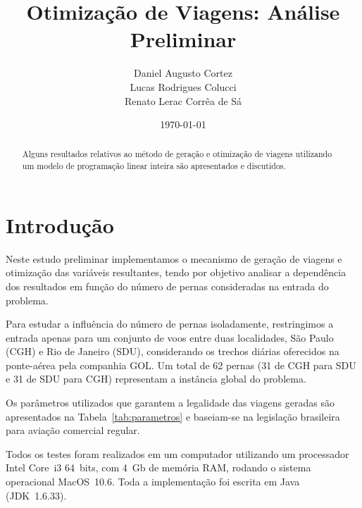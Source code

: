 \documentclass[12pt,a4paper]{article}
\newcommand{\zerar}{\setcounter{equation}{0}\setcounter{figure}{0}\setcounter{table}{0}}
\begin{document}
\title{\bf Otimização de Viagens: Análise Preliminar}
\author{Daniel Augusto Cortez \\ Lucas Rodrigues Colucci \\ Renato Lerac Corrêa de Sá}
\date{\today}

\maketitle

\begin{abstract}
	Alguns resultados relativos ao método de geração e otimização de viagens
	utilizando um modelo de programação linear inteira são apresentados e discutidos.
\end{abstract}


\zerar
\section{Introdução}
\label{sec:introducao}

Neste estudo preliminar implementamos o mecanismo de geração de viagens e otimização das variáveis
resultantes, tendo por objetivo analisar a dependência dos resultados em função do número de pernas 
consideradas na entrada do problema. 

Para estudar a influência do número de pernas isoladamente, restringimos a entrada apenas para um
conjunto de voos entre duas localidades, São Paulo (CGH) e Rio de Janeiro (SDU), considerando os
trechos diárias oferecidos na ponte-aérea pela companhia GOL. Um total de 62 pernas (31 de CGH para 
SDU e 31 de SDU para CGH) representam a instância global do problema.

Os parâmetros utilizados que garantem a legalidade das viagens geradas são apresentados na 
Tabela~\ref{tab:parametros} e baseiam-se na legislação brasileira para aviação comercial regular. 

Todos os testes foram realizados em um computador utilizando um processador Intel Core~i3 64~bits, 
com 4~Gb de memória RAM, rodando o sistema operacional MacOS~10.6. Toda a implementação foi escrita 
em Java (JDK~1.6.33).
\end{document}
